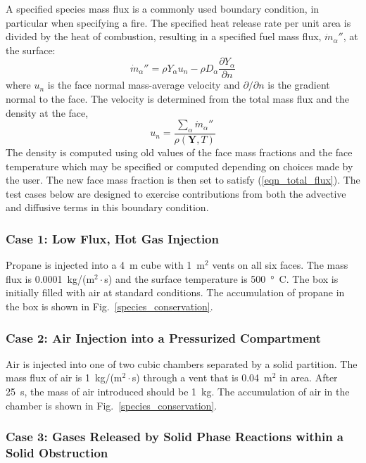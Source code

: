 \documentclass[11pt]{book}
\begin{document}
A specified species mass flux is a commonly used boundary condition, in particular when specifying a fire.  The specified heat release rate per unit area is divided by the heat of combustion, resulting in a specified fuel mass flux, $\dot{m}_\alpha''$, at the surface:
\begin{equation}
\label{eqn_total_flux}
\dot{m}_{\alpha}'' = \rho Y_{\alpha} u_n - \rho D_\alpha \frac{\partial Y_\alpha}{\partial n}
\end{equation}
where $u_n$ is the face normal mass-average velocity and $\partial/\partial n$ is the gradient normal to the face.  The velocity is determined from the total mass flux and the density at the face,
\begin{equation}
\label{eqn_un}
u_n = \frac{\sum_\alpha \dot{m}_\alpha''}{\rho(\mathbf{Y},T)}
\end{equation}
The density is computed using old values of the face mass fractions and the face temperature which may be specified or computed depending on choices made by the user.  The new face mass fraction is then set to satisfy (\ref{eqn_total_flux}).  The test cases below are designed to exercise contributions from both the advective and diffusive terms in this boundary condition.

\subsubsection{Case 1: Low Flux, Hot Gas Injection}

Propane is injected into a 4~m cube with 1~m$^2$ vents on all six faces.  The mass flux is 0.0001~kg/(m$^2\cdot$s) and the surface temperature is 500~\si{\degree C}.  The box is initially filled with air at standard conditions.  The accumulation of propane in the box is shown in Fig.~\ref{species_conservation}.

\subsubsection{Case 2: Air Injection into a Pressurized Compartment}

 Air is injected into one of two cubic chambers separated by a solid partition.  The mass flux of air is 1~kg/(m$^2\cdot$s) through a vent that is 0.04~m$^2$ in area. After 25~s, the mass of air introduced should be 1~kg. The accumulation of air in the chamber is shown in Fig.~\ref{species_conservation}.

\subsubsection{Case 3: Gases Released by Solid Phase Reactions within a Solid Obstruction}
\end{document}
